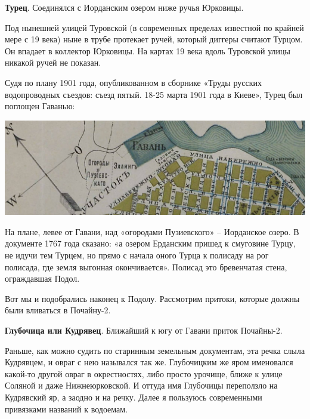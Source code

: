 \textbf{Турец}. Соединялся с Иорданским озером ниже ручья Юрковицы. 

Под нынешней улицей Туровской (в современных пределах известной по крайней мере с 19 века) ныне в трубе протекает ручей, который диггеры считают Турцом. Он впадает в коллектор Юрковицы. На картах 19 века вдоль Туровской улицы никакой ручей не показан.

Судя по плану 1901 года, опубликованном в сборнике «Труды русских водопроводных съездов: съезд пятый. 18-25 марта 1901 года в Киеве», Турец был поглощен Гаванью: 

\begin{center}
\includegraphics[width=\linewidth]{chast-colebanie-osnov/pochayna/1901-turec.jpg}
\end{center}

На плане, левее от Гавани, над «огородами Пузиевского» – Иорданское озеро. В документе 1767 года сказано: «а озером Ерданским пришед к смуговине Турцу, не идучи тем Турцем, но прямо с начала оного Турца к полисаду на рог полисада, где земля выгонная окончивается». Полисад это бревенчатая стена, ограждавшая Подол.



Вот мы и подобрались наконец к Подолу. Рассмотрим притоки, которые должны были вливаться в Почайну-2.

\textbf{Глубочица или Кудрявец}. Ближайший к югу от Гавани приток Почай\-ны-2.

Раньше, как можно судить по старинным земельным документам, эта речка слыла Кудрявцем, и овраг с нею назывался так же. Глубочицким же яром именовался какой-то другой овраг в окрестностях, либо просто урочище, ближе к улице Соляной и даже Нижнеюрковской. И оттуда имя Глубочицы переползло на Кудрявский яр, а заодно и на речку. Далее я пользуюсь современными привязками названий к водоемам.

